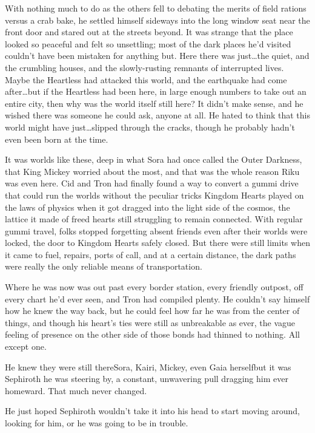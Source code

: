 With nothing much to do as the others fell to debating the merits of field rations versus a crab bake, he settled himself sideways into the long window seat near the front door and stared out at the streets beyond. It was strange that the place looked so peaceful and felt so unsettling; most of the dark places he'd visited couldn't have been mistaken for anything but. Here there was just\ldots the quiet, and the crumbling houses, and the slowly-rusting remnants of interrupted lives. Maybe the Heartless had attacked this world, and the earthquake had come after\ldots but if the Heartless had been here, in large enough numbers to take out an entire city, then why was the world itself still here? It didn't make sense, and he wished there was someone he could ask, anyone at all. He hated to think that this world might have just\ldots slipped through the cracks, though he probably hadn't even been born at the time.

It was worlds like these, deep in what Sora had once called the Outer Darkness, that King Mickey worried about the most, and that was the whole reason Riku was even here. Cid and Tron had finally found a way to convert a gummi drive that could run the worlds without the peculiar tricks Kingdom Hearts played on the laws of physics when it got dragged into the light side of the cosmos, the lattice it made of freed hearts still struggling to remain connected. With regular gummi travel, folks stopped forgetting absent friends even after their worlds were locked, the door to Kingdom Hearts safely closed. But there were still limits when it came to fuel, repairs, ports of call, and at a certain distance, the dark paths were really the only reliable means of transportation.

Where he was now was out past every border station, every friendly outpost, off every chart he'd ever seen, and Tron had compiled plenty. He couldn't say himself how he knew the way back, but he could feel how far he was from the center of things, and though his heart's ties were still as unbreakable as ever, the vague feeling of presence on the other side of those bonds had thinned to nothing. All except one.

He knew they were still there\textemdash Sora, Kairi, Mickey, even Gaia herself\textemdash but it was Sephiroth he was steering by, a constant, unwavering pull dragging him ever homeward. That much never changed.

He just hoped Sephiroth wouldn't take it into his head to start moving around, looking for him, or he was going to be in trouble.

